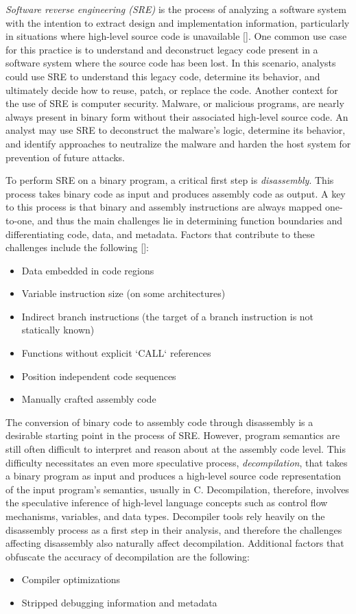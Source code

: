 \emph{Software reverse engineering (SRE)} is the process of analyzing a software system with the intention to extract design and implementation information, particularly in situations where high-level source code is unavailable []. One common use case for this practice is to understand and deconstruct legacy code present in a software system where the source code has been lost. In this scenario, analysts could use SRE to understand this legacy code, determine its behavior, and ultimately decide how to reuse, patch, or replace the code. Another context for the use of SRE is computer security. Malware, or malicious programs, are nearly always present in binary form without their associated high-level source code. An analyst may use SRE to deconstruct the malware's logic, determine its behavior, and identify approaches to neutralize the malware and harden the host system for prevention of future attacks.

To perform SRE on a binary program, a critical first step is \emph{disassembly}. This process takes binary code as input and produces assembly code as output. A key to this process is that binary and assembly instructions are always mapped one-to-one, and thus the main challenges lie in determining function boundaries and differentiating code, data, and metadata. Factors that contribute to these challenges include the following []:
\begin{itemize}
    \item Data embedded in code regions
    \item Variable instruction size (on some architectures)
    \item Indirect branch instructions (the target of a branch instruction is not statically known)
    \item Functions without explicit `CALL` references
    \item Position independent code sequences
    \item Manually crafted assembly code
\end{itemize}

The conversion of binary code to assembly code through disassembly is a desirable starting point in the process of SRE. However, program semantics are still often difficult to interpret and reason about at the assembly code level. This difficulty necessitates an even more speculative process, \emph{decompilation}, that takes a binary program as input and produces a high-level source code representation of the input program's semantics, usually in C. Decompilation, therefore, involves the speculative inference of high-level language concepts such as control flow mechanisms, variables, and data types. Decompiler tools rely heavily on the disassembly process as a first step in their analysis, and therefore the challenges affecting disassembly also naturally affect decompilation. Additional factors that obfuscate the accuracy of decompilation are the following:
\begin{itemize}
    \item Compiler optimizations
    \item Stripped debugging information and metadata
\end{itemize}


